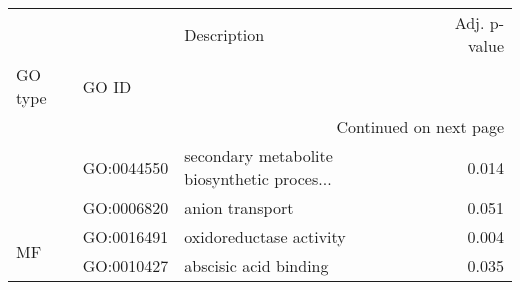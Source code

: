 \begin{longtable}{lllr}
\toprule
   &            &                                  Description &  Adj. p-value \\
GO type & GO ID &                                              &               \\
\midrule
\endhead
\midrule
\multicolumn{4}{r}{{Continued on next page}} \\
\midrule
\endfoot

\bottomrule
\endlastfoot
\multirow{2}{*}{BP} & GO:0044550 &  secondary metabolite biosynthetic proces... &         0.014 \\
   & GO:0006820 &                              anion transport &         0.051 \\
\cline{1-4}
\multirow{2}{*}{MF} & GO:0016491 &                      oxidoreductase activity &         0.004 \\
   & GO:0010427 &                        abscisic acid binding &         0.035 \\
\end{longtable}
